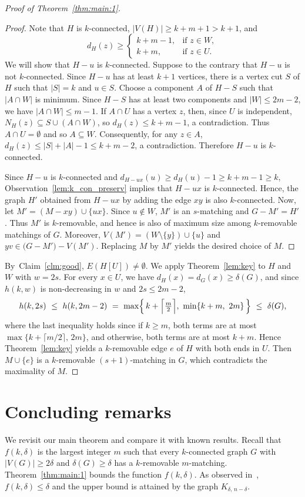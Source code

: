\documentclass[11pt]{article}
\numberwithin{equation}{section}
\begin{document}
\begin{proof}[Proof of Theorem~\ref{thm:main:1}]
\begin{proof}
Note that $H$ is $k$-connected, $|V(H)|\ge k+m+1>k+1$, and 
\[
d_{H}(z)\ge
\begin{cases}
k+m-1,& \text{if } z\in W,\\
k+m,& \text{if } z\in U.
\end{cases}
\]
We will show that  $H-u$ is $k$-connected.
Suppose to the contrary that $H-u$ is not $k$-connected. Since $H-u$ has at least $k+1$ vertices, there is a vertex cut $S$ of $H$ such that $|S|=k$ and $u\in S$.
Choose a component $A$ of $H-S$ such that $|A \cap W|$ is minimum.
Since $H-S$ has at least two components and $|W| \le 2m-2$, we have $|A \cap W| \le m-1$.
If $A\cap U$ has a vertex $z$, then, since $U$ is independent, $N_H(z) \subseteq S \cup (A \cap W)$, so $d_H(z)\le k+m-1$, a contradiction.
Thus $A\cap U=\emptyset$ and so $A \subseteq W$.
Consequently, for any $z\in A$, $d_H(z)\le |S|+|A|-1 \le k+m-2$, a contradiction.
Therefore $H-u$ is $k$-connected.


Since $H-u$ is $k$-connected and $d_{H-ux}(u) \ge d_H(u)-1 \ge k+m-1 \ge k$, Observation~\ref{lem:k_con_preserv} implies that $H-ux$ is $k$-connected.
Hence, the graph $H'$ obtained from $H-ux$ by adding the edge $xy$  is also $k$-connected.
Now, let $M'=(M-xy)\cup \{ux\}$. 
Since $u \not\in W$, $M'$ is an $s$-matching and $G-M'=H'$. 
Thus $M'$ is $k$-removable, and hence is also of maximum size among $k$-removable matchings of $G$.
Moreover, $V(M')=(W\setminus\{y\})\cup\{u\}$ and $yv \in \bigl(G-M'\bigr)-V(M')$. 
Replacing $M$ by $M'$ yields the desired choice of $M$.
\end{proof}

By~Claim~\ref{clm:good}, $E(H[U])\neq \emptyset$.
We apply Theorem~\ref{lem:key} to $H$ and $W$ with $w=2s$. For every $x\in U$, we
have $d_H(x)=d_G(x)\ge\delta(G)$, and since $h(k,w)$ is non-decreasing in $w$ and
$2s\le 2m-2$,
\[
   h(k,2s)\ \le\ h(k,2m-2)
   \ =\ \max\Bigl\{\,k+\Bigl\lceil\tfrac m2\Bigr\rceil,\
   \min\{k+m,\ 2m\}\,\Bigr\}\ \le\ \delta(G),
\]
where the last inequality holds since if $k\ge m$, both terms are at most $\max\{k+\lceil m/2\rceil,\,2m\}$, and otherwise, both terms are at most $k+m$.
Hence Theorem~\ref{lem:key} yields a $k$-removable edge $e$ of $H$ with both ends
in $U$. Then $M\cup\{ e \}$ is a $k$-removable $(s+1)$-matching in $G$,
which contradicts the maximality of $M$.
\end{proof}

\section{Concluding remarks}\label{sec:concluding}
We revisit our main theorem and compare it with known results. 
Recall that 
$f(k,\delta)$ is the largest integer $m$ such that every $k$-connected graph $G$ with $|V(G)|\ge 2\delta$ and $\delta(G)\ge \delta$ has a $k$-removable $m$-matching. 
Theorem~\ref{thm:main:1} bounds the function $f(k,\delta)$.
As observed in~\cite{lzfm},  $f(k,\delta) \le \delta$ and the upper bound is  attained by the graph $K_{\delta,\,n-\delta}$. 
\end{document}
